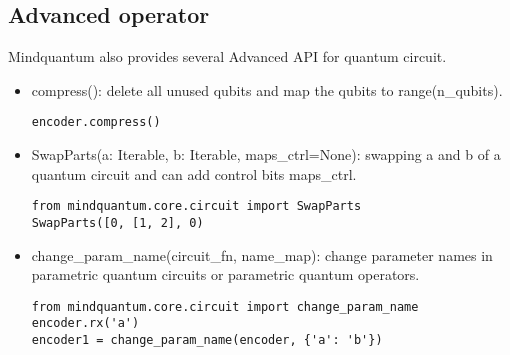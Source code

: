 \subsection{Advanced operator}
Mindquantum also provides several Advanced API for quantum circuit.
\begin{itemize}
    \item compress(): delete all unused qubits and map the qubits to range(n\_qubits).
    \begin{lstlisting}
encoder.compress()        
    \end{lstlisting}
    \item SwapParts(a: Iterable, b: Iterable, maps\_ctrl=None): swapping a and b of a quantum circuit and can add control bits maps\_ctrl.
    \begin{lstlisting}
from mindquantum.core.circuit import SwapParts
SwapParts([0, [1, 2], 0)        
    \end{lstlisting}
    \item change\_param\_name(circuit\_fn, name\_map): change parameter names in parametric quantum circuits or parametric quantum operators.
    \begin{lstlisting}
from mindquantum.core.circuit import change_param_name
encoder.rx('a')
encoder1 = change_param_name(encoder, {'a': 'b'})        
\end{lstlisting}
\end{itemize}